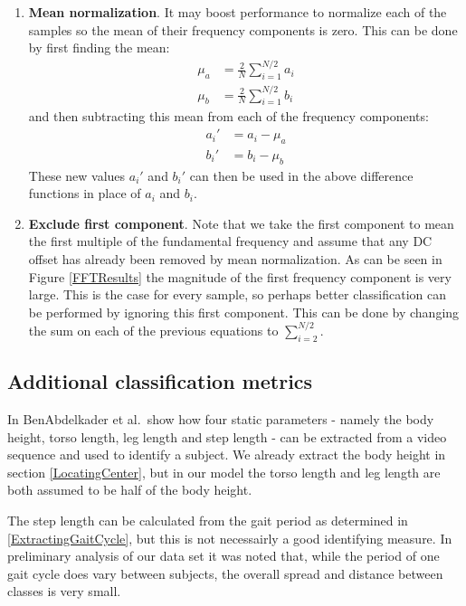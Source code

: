 \begin{enumerate}
	\item \textbf{Mean normalization}.
		It may boost performance to normalize each of the samples so the mean of their frequency components is zero.
		This can be done by first finding the mean:
		\begin{align}
			\mu_a &= \frac{2}{N} \sum_{i=1}^{N/2} a_i \\
			\mu_b &= \frac{2}{N} \sum_{i=1}^{N/2} b_i
		\end{align}
		and then subtracting this mean from each of the frequency components:
		\begin{align}
			a_i' &= a_i - \mu_a \\
			b_i' &= b_i - \mu_b
		\end{align}
		These new values $a_i'$ and $b_i'$ can then be used in the above difference functions in place of $a_i$ and $b_i$.
	
	\item \textbf{Exclude first component}.
		Note that we take the first component to mean the first multiple of the fundamental frequency and assume that any DC offset has already been removed
		by mean normalization.
		As can be seen in Figure \ref{FFTResults} the magnitude of the first frequency component is very large.
		This is the case for every sample, so perhaps better classification can be performed by ignoring this first component.
		This can be done by changing the sum on each of the previous equations to $\sum_{i=2}^{N/2}$.
\end{enumerate}


\subsection{Additional classification metrics}

In \cite{StrideCadence} BenAbdelkader et al.\ show how four static parameters - namely the body height, torso length, leg length and step length - can be extracted from a video sequence and used to identify a subject.
We already extract the body height in section \ref{LocatingCenter}, but in our model the torso length and leg length are both assumed to be half of the body height.

The step length can be calculated from the gait period as determined in \ref{ExtractingGaitCycle}, but this is not necessairly a good identifying measure.
In preliminary analysis of our data set it was noted that, while the period of one gait cycle does vary between subjects, the overall spread and distance between classes is very small.

